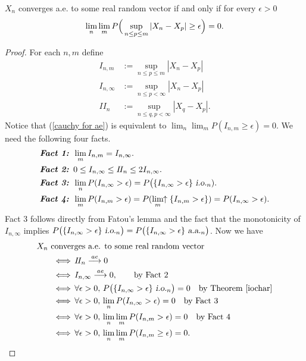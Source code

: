 \begin{theorem}
$X_n$ converges a.e. to some real random vector if and only if for every $\epsilon >0$
\begin{equation}
\label{cauchy for ae}
\lim_{n}\lim_{m} P\Bigl(\, \displaystyle\sup_{n\leq p\leq m} |X_n-X_p| \geq \epsilon \Bigr)=0.
\end{equation}
\end{theorem}
\begin{proof}
For each $n,m$ define
\begin{align*}
I_{n,m} &:= \sup_{n\leq p\leq m} |X_n-X_p| \\
I_{n,\infty} &:= \sup_{n\leq p< \infty} |X_n-X_p| \\
I\!I_{n} &:= \sup_{n\leq q, p < \infty} |X_q-X_p|.
\end{align*}
Notice that (\ref{cauchy for ae}) is equivalent to $\lim_n\lim_m P(I_{n,m}\geq \epsilon)=0$. We need the following four facts. 
\begin{align*}
&\text{\bf \em Fact 1: }\lim_{m} I_{n,m} = I_{n,\infty}. \\
&\text{\bf \em Fact 2: }0\leq I_{n,\infty} \leq I\!I_{n}\leq 2I_{n,\infty}. \\
&\text{\bf \em Fact 3: }\lim_n P(I_{n,\infty} >\epsilon) = P\bigl(\{I_{n,\infty} > \epsilon\} {\,\,\text{\sl i.o.} }_n).\\
&\text{\bf \em Fact 4: }\lim_m P(I_{n,m} >\epsilon) = P(\displaystyle\lim_{m}\!\!\uparrow \{I_{n,m} >\epsilon\}) = P(I_{n,\infty} > \epsilon).
\end{align*}
Fact 3 follows directly from Fatou's lemma and the fact that the monotonicity of $I_{n,\infty}$ implies  $P\bigl(\{I_{n,\infty} > \epsilon\} {\,\,\text{\sl i.o.} }_n\bigr) = P\bigl(\{I_{n,\infty} > \epsilon\} {\,\,\text{\sl a.a.} }_n\bigr)$.  Now we have 
\begin{align*}
&\text{$X_n$ converges a.e. to some real random vector } \\
&\qquad \Longleftrightarrow\, I\!I_{n} \overset{\small ae} \longrightarrow 0 \\
&\qquad \Longleftrightarrow\, I_{n,\infty} \overset{\small ae} \longrightarrow 0,\qquad\text{by Fact 2} \\
&\qquad \Longleftrightarrow\,  \forall \epsilon > 0,\, P\bigl(\{I_{n,\infty} >\epsilon\} {\,\,\text{\sl i.o.} }_n\bigr) = 0 \quad\text{by Theorem \ref{iochar}}\\
&\qquad \Longleftrightarrow\, \forall \epsilon > 0,\, \lim_n P(I_{n,\infty} >\epsilon) =0 \quad\text{by Fact 3}\\
&\qquad \Longleftrightarrow\, \forall \epsilon > 0,\,  \lim_n \lim_m P(I_{n,m} >\epsilon) =0 \quad\text{by Fact 4}\\
&\qquad \Longleftrightarrow\, \forall \epsilon > 0,\,  \lim_n \lim_m P(I_{n,m} \geq \epsilon) =0.
\end{align*}
\end{proof}



